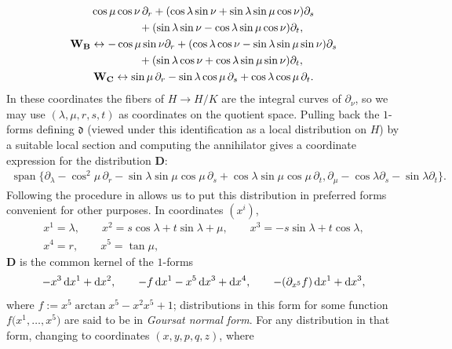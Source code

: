 \documentclass[10pt,a4paper]{amsart}
\newcommand{\mbA}{\mathbf{A}}
\newcommand{\mbB}{\mathbf{B}}
\newcommand{\mbC}{\mathbf{C}}
\newcommand{\mbD}{\mathbf{D}}
\newcommand{\mbW}{\mathbf{W}}
\newcommand{\mfd} {\mathfrak{d}}
\numberwithin{equation}{section}
\begin{document}
\begin{Example}
\begin{gather*}
		\cos \mu \cos \nu \, \partial_r
			+ (\cos \lambda \sin \nu + \sin \lambda \sin \mu \cos \nu) \partial_s \\
\hphantom{\mbW_{\mbA}\leftrightarrow}{} + (\sin \lambda \sin \nu - \cos \lambda \sin \mu \cos \nu) \partial_t , \\
	\mbW_{\mbB}\leftrightarrow
		-\cos \mu \sin \nu \partial_r
			+ (\cos \lambda \cos \nu - \sin \lambda \sin \mu \sin \nu) \partial_s \\
\hphantom{\mbW_{\mbB}\leftrightarrow}{} + (\sin \lambda \cos \nu + \cos \lambda \sin \mu \sin \nu) \partial_t , \\
	\mbW_{\mbC}\leftrightarrow
		\sin \mu \,\partial_r
			- \sin \lambda \cos \mu \,\partial_s
			+ \cos \lambda \cos \mu \,\partial_t .
\end{gather*}
In these coordinates the fibers of $H \to H / K$ are the integral curves of $\partial_{\nu}$, so we may use $(\lambda, \mu, r, s, t)$ as coordinates on the quotient space. Pulling back the $1$-forms defining $\mfd$ (viewed under this identification as a local distribution on $H$) by a suitable local section and computing the annihilator gives a coordinate expression for the distribution $\mbD$:
\begin{gather*}
	\operatorname{span}\big\{
		\partial_{\lambda}
			- \cos^2 \mu \, \partial_r
			- \sin \lambda \sin \mu \cos \mu \, \partial_s
			+ \cos \lambda \sin \mu \cos \mu \, \partial_t ,
		\partial_{\mu}
			- \cos \lambda \partial_s
			- \sin \lambda \partial_t
	\big\} .
\end{gather*}
Following the procedure in \cite[Section~2]{Strazzullo} allows us to put this distribution in preferred forms convenient for other purposes. In coordinates $(x^i)$,
\begin{gather*}
	x^1 = \lambda, \qquad
	x^2 = s \cos \lambda + t \sin \lambda + \mu, \qquad
	x^3 = -s \sin \lambda + t \cos \lambda, \\
	x^4 = r, \qquad
	x^5 = \tan \mu ,
\end{gather*}
$\mbD$ is the common kernel of the $1$-forms
\begin{gather*}
	-x^3 \,{\rm d}x^1 + {\rm d}x^2, \qquad
	- f \,{\rm d}x^1 - x^5 \,{\rm d}x^3 + {\rm d}x^4, \qquad
	- (\partial_{x^5} f) \,{\rm d}x^1 + {\rm d}x^3 ,
\end{gather*}
where $f := x^5 \arctan x^5 - x^2 x^5 + 1$; distributions in this form for some function $f\big(x^1, \ldots, x^5\big)$ are said to be in \textit{Goursat normal form}. For any distribution in that form, changing to coordinates $(x, y, p, q, z)$, where

\end{Example}
\end{document}
